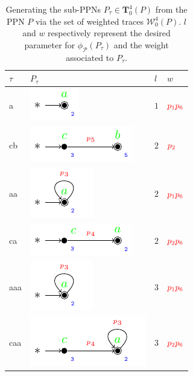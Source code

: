 \begin{table}[!t]
	\caption{Generating the sub-PPNs $P_\tau\in \mathbf{T}_0^4(P)$ from the PPN $P$ via the set of weighted traces $\mathcal{W}_0^4(P)$. $l$ and $w$ respectively represent the desired parameter for $\phi_{\mathcal{P}}(P_\tau)$ and the weight associated to $P_\tau$.}\label{tab:proj}
	\centering
	\begin{tabular}{>{\centering\arraybackslash} m{1cm}| >{\centering\arraybackslash} m{4cm} >{\centering\arraybackslash} m{1cm} >{\centering\arraybackslash} m{1cm} }
		\toprule
		$\tau$&$P_\tau$&$l$&$w$\\
		\midrule
		a & \includegraphics{images/trace_a} & $1$ & $\color{red}p_1p_6$\\   
		cb & \includegraphics{images/trace_cb} & $2$ & $\color{red}p_2$\\
		aa & \includegraphics{images/trace_a_loop} & $2$ & $\color{red}p_1p_6$\\ 
		ca & \includegraphics{images/trace_ca} & $2$ & $\color{red}p_2p_6$\\ 
		aaa & \includegraphics{images/trace_a_loop} & $3$ & $\color{red}p_1p_6$\\ 
		caa & \includegraphics{images/trace_ca_loop} & $3$ & $\color{red}p_2p_6$\\  

\end{tabular}
\end{table}
